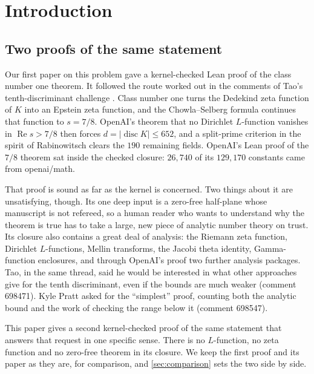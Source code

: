 \documentclass[11pt]{article}
\theoremstyle{definition}
\newcommand{\re}{\operatorname{Re}}
\newcommand{\disc}{\operatorname{disc}}
\begin{document}
\section{Introduction}

\subsection{Two proofs of the same statement}

Our first paper on this problem \cite{CN1paper} gave a kernel-checked Lean proof of the class number one theorem. It followed the route worked out in the comments of Tao's tenth-discriminant challenge \cite{Tao2026}. Class number one turns the Dedekind zeta function of $K$ into an Epstein zeta function, and the Chowla--Selberg formula \cite{ChowlaSelberg1967} continues that function to $s = 7/8$. OpenAI's theorem that no Dirichlet $L$-function vanishes in $\re s > 7/8$ \cite{OAImath,OAIqrh} then forces $d = |\disc K| \le 652$, and a split-prime criterion in the spirit of Rabinowitsch \cite{Rabinowitsch1913} clears the $190$ remaining fields. OpenAI's Lean proof of the $7/8$ theorem sat inside the checked closure: $26{,}740$ of its $129{,}170$ constants came from openai/math.

That proof is sound as far as the kernel is concerned. Two things about it are unsatisfying, though. Its one deep input is a zero-free half-plane whose manuscript is not refereed, so a human reader who wants to understand why the theorem is true has to take a large, new piece of analytic number theory on trust. Its closure also contains a great deal of analysis: the Riemann zeta function, Dirichlet $L$-functions, Mellin transforms, the Jacobi theta identity, Gamma-function enclosures, and through OpenAI's proof two further analysis packages. Tao, in the same thread, said he would be interested in what other approaches give for the tenth discriminant, even if the bounds are much weaker (comment 698471). Kyle Pratt asked for the ``simplest'' proof, counting both the analytic bound and the work of checking the range below it (comment 698547).

This paper gives a second kernel-checked proof of the same statement that answers that request in one specific sense. There is no $L$-function, no zeta function and no zero-free theorem in its closure. We keep the first proof and its paper as they are, for comparison, and \cref{sec:comparison} sets the two side by side.
\end{document}
